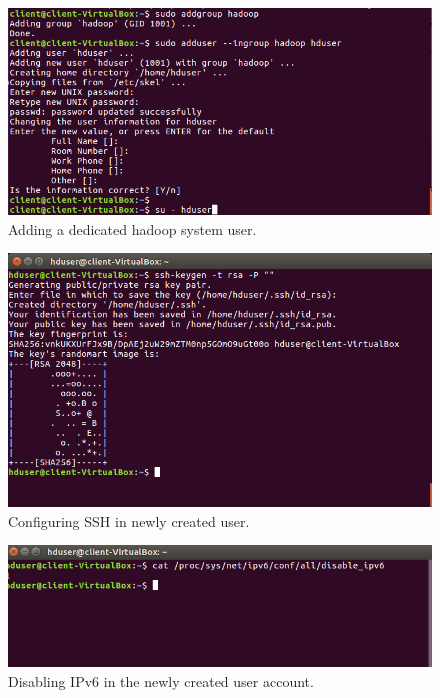 \documentclass[a4paper,10pt]{article}
\begin{document}
\begin{figure}[h]
	\includegraphics[scale=0.34,center]{exptFourScreenShot/fig3.png}
	\caption{Adding a dedicated hadoop system user.}
	\label{fig:3}
\end{figure}
\newpage
\begin{figure}[h]
	\includegraphics[scale=0.30,center]{exptFourScreenShot/fig4.png}
	\caption{Configuring SSH in newly created user.}
	\label{fig:4}
\end{figure}

\begin{figure}[h]
	\includegraphics[scale=0.34,center]{exptFourScreenShot/fig5.png}
	\caption{Disabling IPv6 in the newly created user account.}
	\label{fig:5.1}
\end{figure}
\end{document}
